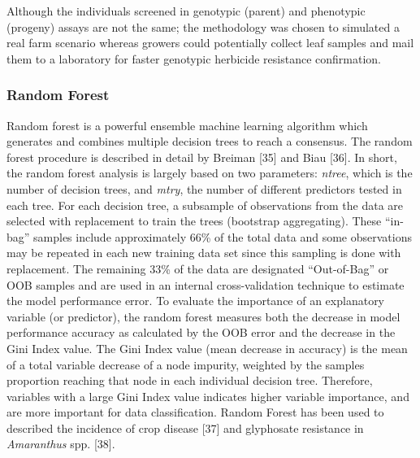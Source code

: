 \documentclass[10pt,letterpaper]{article}
\begin{document}
Although the individuals screened in genotypic (parent) and phenotypic
(progeny) assays are not the same; the methodology was chosen to
simulated a real farm scenario whereas growers could potentially collect
leaf samples and mail them to a laboratory for faster genotypic
herbicide resistance confirmation.

\hypertarget{random-forest}{%
\subsubsection{Random Forest}\label{random-forest}}

Random forest is a powerful ensemble machine learning algorithm which
generates and combines multiple decision trees to reach a consensus. The
random forest procedure is described in detail by Breiman {[}35{]} and
Biau {[}36{]}. In short, the random forest analysis is largely based on
two parameters: \emph{ntree}, which is the number of decision trees, and
\emph{mtry}, the number of different predictors tested in each tree. For
each decision tree, a subsample of observations from the data are
selected with replacement to train the trees (bootstrap aggregating).
These ``in-bag'' samples include approximately 66\% of the total data
and some observations may be repeated in each new training data set
since this sampling is done with replacement. The remaining 33\% of the
data are designated ``Out-of-Bag'' or OOB samples and are used in an
internal cross-validation technique to estimate the model performance
error. To evaluate the importance of an explanatory variable (or
predictor), the random forest measures both the decrease in model
performance accuracy as calculated by the OOB error and the decrease in
the Gini Index value. The Gini Index value (mean decrease in accuracy)
is the mean of a total variable decrease of a node impurity, weighted by
the samples proportion reaching that node in each individual decision
tree. Therefore, variables with a large Gini Index value indicates
higher variable importance, and are more important for data
classification. Random Forest has been used to described the incidence
of crop disease {[}37{]} and glyphosate resistance in \emph{Amaranthus}
spp. {[}38{]}.
\end{document}
